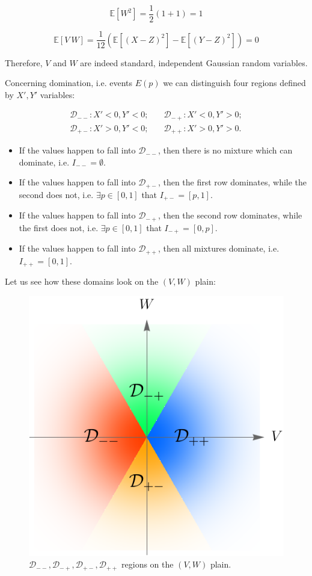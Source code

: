\documentclass{article}
\theoremstyle{definition}
\begin{document}
\begin{appendices}
\begin{equation}
    \mathbb{E}[W^2] = \frac{1}{2} (1 + 1) = 1
\end{equation}

\begin{equation}
    \mathbb{E}[V \ W] = \frac{1}{12} ( \mathbb{E}[(X-Z)^2] - \mathbb{E}[(Y-Z)^2] ) = 0
\end{equation}

Therefore, $V$ and $W$ are indeed standard, independent Gaussian random variables.

Concerning domination, i.e. events $E(p)$ we can distinguish four regions defined by $X',Y'$ variables:

\begin{equation}
\begin{split}
    \mathcal{D}_{--}: X' < 0, Y' < 0; & \quad
    \mathcal{D}_{-+}: X' < 0, Y' > 0; \\
    \mathcal{D}_{+-}: X' > 0, Y' < 0;  & \quad
    \mathcal{D}_{++}: X' > 0, Y' > 0. 
\end{split}
\end{equation}

\begin{itemize}
    \item If the values happen to fall into $\mathcal{D}_{--}$, then there is no mixture which can dominate, i.e. $I_{--}=\emptyset$.
    \item If the values happen to fall into $\mathcal{D}_{+-}$, then the first row dominates, while the second does not, i.e. $\exists p\in [0,1]$ that $I_{+-}=[p,1]$.
    \item If the values happen to fall into $\mathcal{D}_{-+}$, then the second row dominates, while the first does not, i.e. $\exists p\in [0,1]$ that $I_{-+}=[0,p]$.
    \item If the values happen to fall into $\mathcal{D}_{++}$, then all mixtures dominate, i.e. $I_{++}=[0,1]$.
\end{itemize}

Let us see how these domains look on the $(V, W)$ plain:

\begin{figure}[H]
    \centering
    \includegraphics[width=8 cm]{img/VW_regions.png}
    \caption{$\mathcal{D}_{--}, \mathcal{D}_{-+}, \mathcal{D}_{+-}, \mathcal{D}_{++}$ regions on the $(V,W)$ plain.}
    \label{fig:VW_D}
\end{figure}


\end{appendices}
\end{document}

